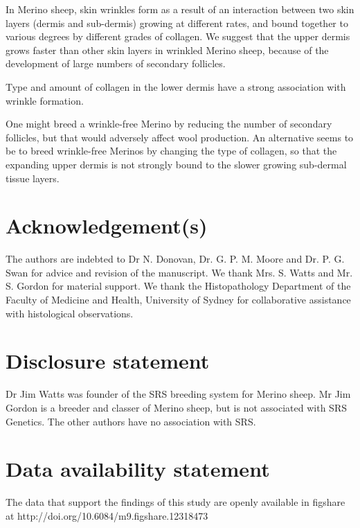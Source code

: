 \documentclass[]{interact}
\theoremstyle{plain}%
\theoremstyle{definition}
\theoremstyle{remark}
\begin{document}
 In Merino sheep, skin wrinkles form as a result of an interaction between two skin layers (dermis and sub-dermis) growing at different rates, and bound together to various degrees by different grades of collagen.  We suggest that the upper dermis grows faster than other skin layers in wrinkled Merino sheep, because of the development of large numbers of secondary follicles. 

Type and amount of collagen in the lower dermis have a strong association with wrinkle formation.

One might breed a wrinkle-free Merino by reducing the number of secondary follicles, but that would adversely affect wool production.  An alternative seems to be to breed wrinkle-free Merinos by changing the type of collagen, so that the expanding upper dermis is not strongly bound to the slower growing sub-dermal tissue layers.


\section*{Acknowledgement(s)}
The authors are indebted to Dr N. Donovan, Dr. G. P. M. Moore and Dr. P. G. Swan for advice and revision of the manuscript. We thank Mrs. S. Watts and Mr. S. Gordon for material support. We thank the Histopathology Department of the Faculty of Medicine and Health, University of Sydney for collaborative assistance with histological observations.

\section*{Disclosure statement}
Dr Jim Watts was founder of the SRS breeding system for Merino sheep. Mr Jim Gordon is a breeder and classer of Merino sheep, but is not associated with SRS Genetics. The other authors have no association with SRS.

\section*{Data availability statement}
The data that support the findings of this study are openly available in figshare at http://doi.org/10.6084/m9.figshare.12318473




\listoffigures
\listoftables
\end{document}
